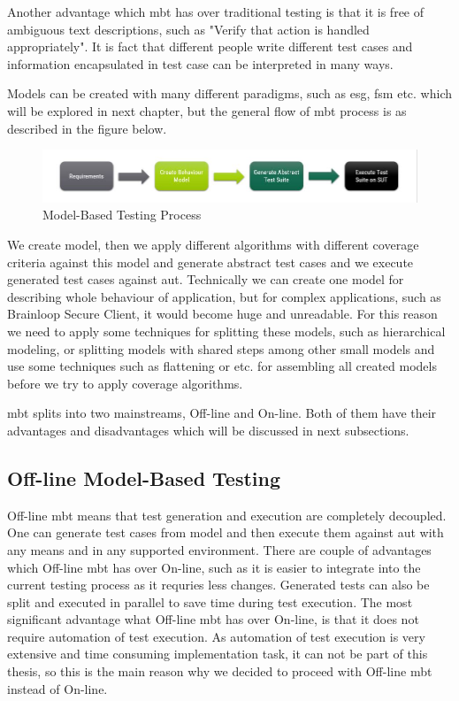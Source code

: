 \par
Another advantage which \acrlong{mbt} has over traditional testing is that it is free of ambiguous text descriptions, such as "Verify that action is handled appropriately". It is fact that different people write different test cases and information encapsulated in test case can be interpreted in many ways.

\par
Models can be created with many different paradigms, such as \acrlong{esg}, \acrlong{fsm} etc. which will be explored in next chapter, but the general flow of \acrlong{mbt} process is as described in the figure below. 


\begin{figure} [htbp!]
	\centering
					\includegraphics[width=1.1\textwidth]{figures/MBT_Flow.JPG}
					\caption{\label{Fig:MBT_Flow} Model-Based Testing Process}
\end{figure}

We create model, then we apply different algorithms with different coverage criteria against this model and generate abstract test cases and we execute generated test cases against \acrlong{aut}. Technically we can create one model for describing whole behaviour of application, but for complex applications, such as Brainloop Secure Client, it would become huge and unreadable. For this reason we need to apply some techniques for splitting these models, such as hierarchical modeling, or splitting models with shared steps among other small models and use some techniques such as flattening or etc. for assembling all created models before we try to apply coverage algorithms.

\par
\acrlong{mbt} splits into two mainstreams, Off-line and On-line. Both of them have their advantages and disadvantages which will be discussed in next subsections.

\subsection{Off-line Model-Based Testing}
Off-line \acrlong{mbt} means that test generation and execution are completely decoupled. One can generate test cases from model and then execute them against \acrlong{aut} with any means and in any supported environment. There are couple of advantages which Off-line \acrlong{mbt} has over On-line, such as it is easier to integrate into the current testing process as it requries less changes. Generated tests can also be split and executed in parallel to save time during test execution. The most significant advantage what Off-line \acrlong{mbt} has over On-line, is that it does not require automation of test execution. As automation of test execution is very extensive and time consuming implementation task, it can not be part of this thesis, so this is the main reason why we decided to proceed with Off-line \acrlong{mbt} instead of On-line.

